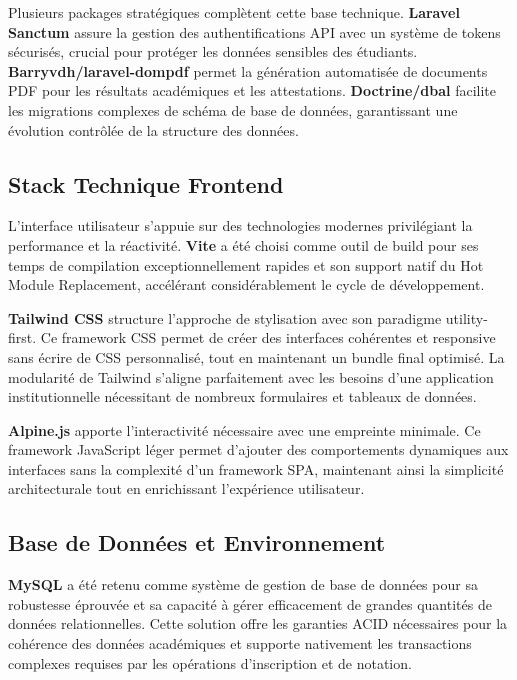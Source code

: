 \documentclass[12pt,a4paper]{report}
\begin{document}
Plusieurs packages stratégiques complètent cette base technique. \textbf{Laravel Sanctum} assure la gestion des authentifications API avec un système de tokens sécurisés, crucial pour protéger les données sensibles des étudiants. \textbf{Barryvdh/laravel-dompdf} permet la génération automatisée de documents PDF pour les résultats académiques et les attestations. \textbf{Doctrine/dbal} facilite les migrations complexes de schéma de base de données, garantissant une évolution contrôlée de la structure des données.

\subsection{Stack Technique Frontend}

L'interface utilisateur s'appuie sur des technologies modernes privilégiant la performance et la réactivité. \textbf{Vite} a été choisi comme outil de build pour ses temps de compilation exceptionnellement rapides et son support natif du Hot Module Replacement, accélérant considérablement le cycle de développement.

\textbf{Tailwind CSS} structure l'approche de stylisation avec son paradigme utility-first. Ce framework CSS permet de créer des interfaces cohérentes et responsive sans écrire de CSS personnalisé, tout en maintenant un bundle final optimisé. La modularité de Tailwind s'aligne parfaitement avec les besoins d'une application institutionnelle nécessitant de nombreux formulaires et tableaux de données.

\textbf{Alpine.js} apporte l'interactivité nécessaire avec une empreinte minimale. Ce framework JavaScript léger permet d'ajouter des comportements dynamiques aux interfaces sans la complexité d'un framework SPA, maintenant ainsi la simplicité architecturale tout en enrichissant l'expérience utilisateur.

\subsection{Base de Données et Environnement}

\textbf{MySQL} a été retenu comme système de gestion de base de données pour sa robustesse éprouvée et sa capacité à gérer efficacement de grandes quantités de données relationnelles. Cette solution offre les garanties ACID nécessaires pour la cohérence des données académiques et supporte nativement les transactions complexes requises par les opérations d'inscription et de notation.
\end{document}
